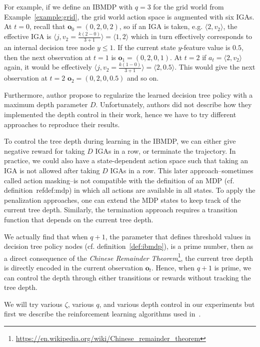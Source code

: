 For example, if we define an IBMDP with $q=3$ for the grid world from Example~\ref{example:grid}, the grid world action space is augmented with six IGAs. 
At $t=0$, recall that $\boldsymbol{o}_0=(0, 2, 0, 2)$, so if an IGA is taken, e.g. $\langle 2, v_2\rangle$, the effective IGA is $\langle j, v_2=\frac{k(2-0)}{3+1}\rangle = \langle 1, 2 \rangle$ which in turn effectively corresponds to an internal decision tree node $y \leq 1$.
If the current state $y$-feature value is $0.5$, then the next observation at $t=1$ is $\boldsymbol{o}_1=(0, 2, 0, 1)$. At $t=2$ if $a_t=\langle 2, v_2 \rangle$ again, it would be effectively $\langle j, v_2=\frac{k(1-0)}{3+1}\rangle = \langle 2, 0.5 \rangle$. 
This would give the next observation at $t=2$ $\boldsymbol{o}_2=(0, 2, 0, 0.5)$ and so on. 

Furthermore, author propose to regularize the learned decision tree policy with a maximum depth parameter $D$.
Unfortunately, authors did not describe how they implemented the depth control in their work, hence we have to try different approaches to reproduce their results.

To control the tree depth during learning in the IBMDP, we can either give negative reward for taking $D$ IGAs in a row, or terminate the trajectory.
In practice, we could also have a state-dependent action space such that taking an IGA is not allowed after taking $D$ IGAs in a row.
This later approach--sometimes called action masking--is not compatible with the definition of an MDP (cf. definition~ref{def:mdp}) in which all actions are available in all states. 
To apply the penalization approaches, one can extend the MDP states to keep track of the current tree depth.
Similarly, the termination approach requires a transition function that depends on the current tree depth.

We actually find that when $q+1$, the parameter that defines threshold values in decision tree policy nodes (cf. definition~\ref{def:ibmdp}), is a prime number, then as a direct consequence of the \textit{Chinese Remainder Theorem}\footnote{\url{https://en.wikipedia.org/wiki/Chinese_remainder_theorem}}, the current tree depth is directly encoded in the current observation $\boldsymbol{o}_t$. 
Hence, when $q+1$ is prime, we can control the depth through either transitions or rewards without tracking the tree depth.

We will try various $\zeta$, various $q$, and various depth control in our experiments but first we describe the reinforcement learning algorithms used in~\cite{topin2021iterative}.

